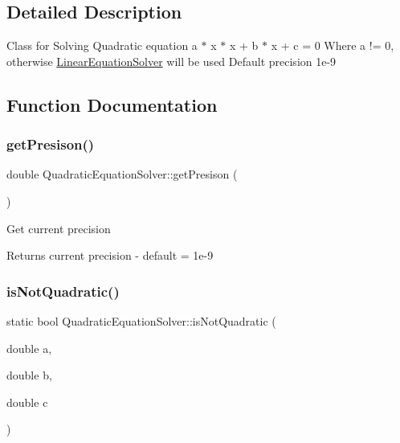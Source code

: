 \subsection{Detailed Description}
Class for Solving Quadratic equation a $\ast$ x $\ast$ x + b $\ast$ x + c = 0 Where a != 0, otherwise \hyperlink{namespaceLinearEquationSolver}{Linear\+Equation\+Solver} will be used Default precision 1e-\/9 

\subsection{Function Documentation}
\mbox{\label{namespaceQuadraticEquationSolver_a7dac20c6acd080ae03efb79265ad0fb6}} 
\subsubsection{\texorpdfstring{get\+Presison()}{getPresison()}}
{\footnotesize\ttfamily double Quadratic\+Equation\+Solver\+::get\+Presison (\begin{DoxyParamCaption}{ }\end{DoxyParamCaption})}

Get current precision \begin{DoxyReturn}{Returns}
current precision -\/ default = 1e-\/9 
\end{DoxyReturn}
\mbox{\label{namespaceQuadraticEquationSolver_a4f2ae1f720093c71706f80e9945bfbe6}} 
\subsubsection{\texorpdfstring{is\+Not\+Quadratic()}{isNotQuadratic()}}
{\footnotesize\ttfamily static bool Quadratic\+Equation\+Solver\+::is\+Not\+Quadratic (\begin{DoxyParamCaption}\item[{double}]{a,  }\item[{double}]{b,  }\item[{double}]{c }\end{DoxyParamCaption})}

